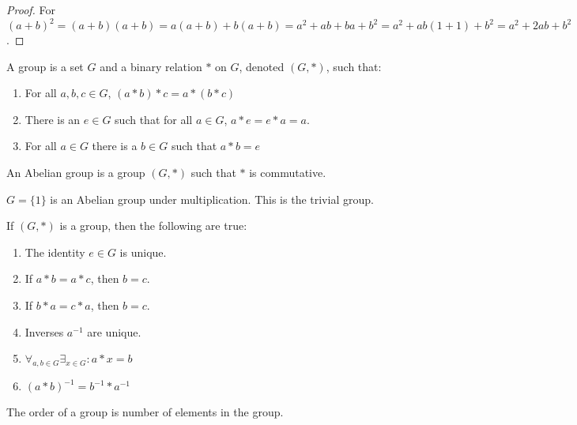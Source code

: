         \begin{proof}
        For $(a+b)^2 = (a+b)(a+b) = a(a+b)+b(a+b) = a^2 + ab + ba + b^2 = a^2 +ab(1+1)+b^2 = a^2 + 2ab + b^2$.
        \end{proof}
        \begin{definition}
            A group is a set $G$ and a binary relation $*$
            on $G$, denoted $(G,*)$, such that:
            \begin{enumerate}
                \item For all ${a,b,c}\in{G}$, $(a*b)*c=a*(b*c)$
                \item There is an ${e}\in{G}$ such that for all
                    ${a}\in{G}$, $a*e=e*a=a$.
                \item For all ${a}\in{G}$ there is a ${b}\in{G}$
                    such that $a*b=e$
            \end{enumerate}
        \end{definition}
        \begin{definition}
            An Abelian group is a group $(G,*)$ such that
            $*$ is commutative.
        \end{definition}
        \begin{example}
            $G=\{1\}$ is an Abelian group
            under multiplication.
            This is the trivial group.
        \end{example}
        \begin{theorem}
            If $(G,*)$ is a group, then the following are true:
            \begin{enumerate}
                \item The identity ${e}\in{G}$ is unique.
                \item If $a*b=a*c$, then $b=c$.
                \item If $b*a=c*a$, then $b=c$.
                \item Inverses $a^{-1}$ are unique.
                \item $\forall_{{a,b}\in{G}}%
                       \exists_{{x}\in{G}}:a*x=b$
                \item $(a*b)^{-1}=b^{-1}*a^{-1}$
            \end{enumerate}
        \end{theorem}
        \begin{definition}
            The order of a group is number of elements in the
            group.
        \end{definition}
